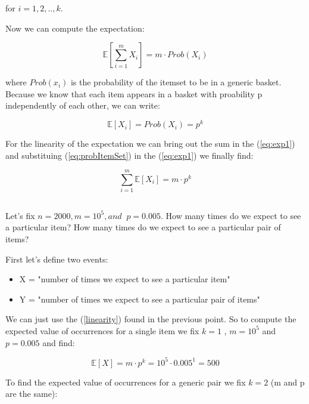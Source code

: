 \documentclass{article}
\begin{document}
for $i = 1,2,..,k$.

Now we can compute the expectation:

\begin{equation} \label{eq:exp1}
\mathbb{E} \left[ \sum_{i=1}^{m} X_{i} \right] = m \cdot Prob(X_{i})
\end{equation}

where $Prob(x_{i})$ is the probability of the itemset to be in a generic basket. Because we know that each item appears in a basket with proability p independently of each other,
we can write:

\begin{equation} \label{eq:probItemSet}
\mathbb{E} \left[ X_i \right] = Prob(X_{i}) = p^k
\end{equation}

For the linearity of the expectation we can bring out the sum in the (\ref{eq:exp1}) and substituing (\ref{eq:probItemSet}) in the (\ref{eq:exp1}) we finally find:

\begin{equation} \label{linearity}
\sum_{i=1}^{m} \mathbb{E} \left[X_i \right] = m \cdot p^k 
\end{equation}





\subsection{}
Let's fix $n = 2000, m = 10^5, and \;\; p = 0.005$. How many times do we expect to see a particular item? How many times do we expect to see a particular pair of items?

First let's define two events:

\begin{itemize}
	\item X = "number of times we expect to see a particular item"
	\item Y = "number of times we expect to see a particular pair of items"
\end{itemize}

We can just use the (\ref{linearity}) found in the previous point. So to compute the expected value of occurrences for a single item we fix $k=1$ , $m=10^5$ and $p=0.005$ and find:

$$ \mathbb{E}  \left[ X \right] = m \cdot p^k = 10^5 \cdot 0.005^1  = 500 $$



To find the expected value of occurrences for a generic pair we fix $k = 2$ (m and p are the same):
\end{document}
